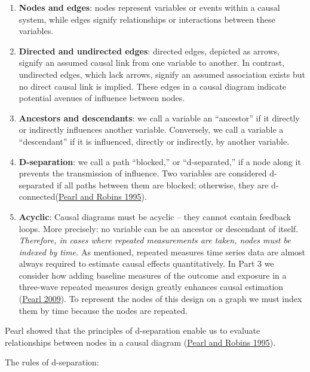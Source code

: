 \documentclass[
  singlecolumn]{article}
\begin{document}
\begin{enumerate}
\def\labelenumi{\arabic{enumi}.}
\item
  \textbf{Nodes and edges}: nodes represent variables or events within a
  causal system, while edges signify relationships or interactions
  between these variables.
\item
  \textbf{Directed and undirected edges}: directed edges, depicted as
  arrows, signify an assumed causal link from one variable to another.
  In contrast, undirected edges, which lack arrows, signify an assumed
  association exists but no direct causal link is implied. These edges
  in a causal diagram indicate potential avenues of influence between
  nodes.
\item
  \textbf{Ancestors and descendants}: we call a variable an ``ancestor''
  if it directly or indirectly influences another variable. Conversely,
  we call a variable a ``descendant'' if it is influenced, directly or
  indirectly, by another variable.
\item
  \textbf{D-separation}: we call a path ``blocked,'' or ``d-separated,''
  if a node along it prevents the transmission of influence. Two
  variables are considered d-separated if all paths between them are
  blocked; otherwise, they are
  d-connected(\protect\hyperlink{ref-pearl1995}{Pearl and Robins 1995}).
\item
  \textbf{Acyclic}: Causal diagrams must be acyclic -- they cannot
  contain feedback loops. More precisely: no variable can be an ancestor
  or descendant of itself. \emph{Therefore, in cases where repeated
  measurements are taken, nodes must be indexed by time.} As mentioned,
  repeated measures time series data are almost always required to
  estimate causal effects quantitatively. In Part 3 we consider how
  adding baseline measures of the outcome and exposure in a three-wave
  repeated measures design greatly enhances causal estimation
  (\protect\hyperlink{ref-pearl2009}{Pearl 2009}). To represent the
  nodes of this design on a graph we must index them by time because the
  nodes are repeated.
\end{enumerate}

Pearl showed that the principles of d-separation enable us to evaluate
relationships between nodes in a causal diagram
(\protect\hyperlink{ref-pearl1995}{Pearl and Robins 1995}).

The rules of d-separation:
\end{document}
